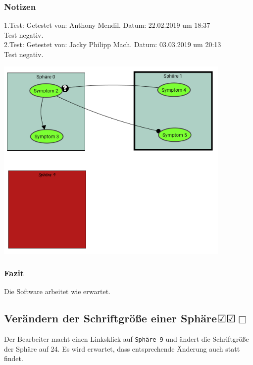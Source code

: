 \documentclass[enabledeprecatedfontcommands]{scrartcl}
\newcommand{\subsectiont}[2]{\subsection[#1]{#1{\normalsize\normalfont #2}}}
\newcommand{\leer}{$\Box$}
\newcommand{\ok}{$\CheckedBox$}
\begin{document}
\subsubsection{Notizen}
1.Test: Getestet von: Anthony Mendil. Datum: 22.02.2019 um 18:37 \\
Test negativ.\\
2.Test: Getestet von: Jacky Philipp Mach. Datum: 03.03.2019 um 20:13 \\
Test negativ. 
\begin{center}
\includegraphics[height=10cm]{2_15.PNG}
\end{center}
\subsubsection{Fazit}
Die Software arbeitet wie erwartet.

\subsectiont{Verändern der Schriftgröße einer Sphäre}{\dotfill\ok\ok\leer}
Der Bearbeiter macht einen Linksklick auf \texttt{Sphäre 9} und ändert die Schriftgröße der Sphäre auf 24. Es wird erwartet, dass entsprechende Änderung auch statt findet. 
\end{document}
